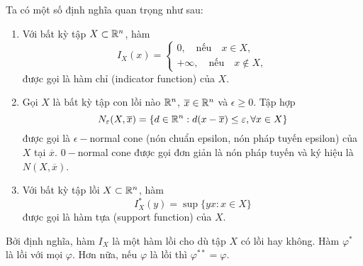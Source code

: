 \documentclass[a4paper]{report}
\begin{document}
    \begin{definition}
        Ta có một số định nghĩa quan trọng như sau:
        \begin{enumerate}[label=(\roman*)]
            \item Với bất kỳ tập $X \subset \mathbb{R}^n$, hàm 
            \begin{equation}
                \label{eq:indicator_function}
                I_X(x) = \begin{cases}
                    0, \quad\text{nếu}\quad x \in X,\\
                    +\infty, \quad\text{nếu}\quad x \notin X,
                \end{cases}
            \end{equation}
            được gọi là hàm chỉ (indicator function) của $X$.
            \item Gọi $X$ là bất kỳ tập con lồi nào $\mathbb{R}^n$, $\overline{x} \in \mathbb{R}^n$ và $\epsilon \geq 0$. Tập hợp 
            \begin{equation}
                \label{eq:epsilon_normal_cone}
                N_\varepsilon(X, \overline{x}) = \{d \in \mathbb{R}^n: d(x - \overline{x}) \leq \varepsilon, \forall x \in X\}
            \end{equation}
            được gọi là $\epsilon-$normal cone (nón chuẩn epsilon, nón pháp tuyến epsilon) của $X$ tại $\overline{x}$. $0-$normal cone được gọi đơn giản là nón pháp tuyến và ký hiệu là $N(X, \overline{x})$.
            \item Với bất kỳ tập lồi $X \subset \mathbb{R}^n$, hàm 
            \begin{equation}
                \label{eq:support_function}
                I^*_X(y) = \sup\{yx: x\in X\}
            \end{equation}
            được gọi là hàm tựa (support function) của $X$.
        \end{enumerate}
    \end{definition}

    \begin{remark}
        Bởi định nghĩa, hàm $I_X$ là một hàm lồi cho dù tập $X$ có lồi hay không. Hàm $\varphi^*$ là lồi với mọi $\varphi$. Hơn nữa, nếu $\varphi$ là lồi thì $\varphi^{**} = \varphi$.
    \end{remark}
\end{document}
